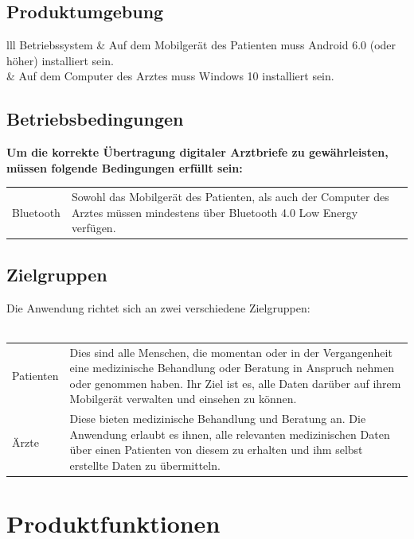 \documentclass[a4paper]{scrreprt}
\begin{document}
\section{Produktumgebung}
\begin{tabular}{lll}
{Betriebssystem} &   {Auf dem Mobilgerät des Patienten muss Android 6.0 (oder höher) installiert sein.}\\
{} &  {Auf dem Computer des Arztes muss Windows 10 installiert sein.} \\
\end{tabular} 

\section{Betriebsbedingungen}
{\textbf{Um die korrekte Übertragung digitaler Arztbriefe zu gewährleisten, müssen folgende Bedingungen erfüllt sein:}} \newline\newline
\begin{tabular}{lll}
\gls{Bluetooth} & \multicolumn{2}{p{11.5cm}}{Sowohl das Mobilgerät des Patienten, als auch der Computer des Arztes müssen mindestens über \gls{Bluetooth} 4.0 Low Energy verfügen.} \\
\end{tabular} 
 
\section{Zielgruppen}
Die Anwendung richtet sich an zwei verschiedene Zielgruppen:  \\\\
\begin{tabular}{lll}
Patienten &  \multicolumn{2}{p{12cm}}{Dies sind alle Menschen, die momentan oder in der Vergangenheit eine medizinische Behandlung oder Beratung in Anspruch nehmen oder genommen haben. Ihr Ziel ist es, alle Daten darüber auf ihrem Mobilgerät verwalten und einsehen zu können.}\\
Ärzte &  \multicolumn{2}{p{12cm}}{Diese bieten medizinische Behandlung und Beratung an. Die Anwendung erlaubt es ihnen, alle relevanten medizinischen Daten über einen Patienten von diesem zu erhalten und ihm selbst erstellte Daten zu übermitteln.}  \\
\end{tabular}

\chapter{Produktfunktionen}
\end{document}
